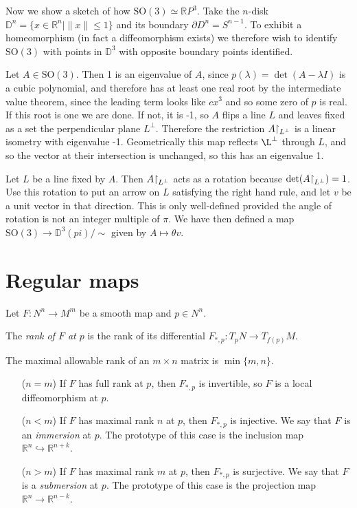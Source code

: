 Now we show a sketch of how $\mathrm{SO}(3) \simeq \mathbb{R}P^3$.
Take the $n$-disk
$\mathbb{D}^n = \{ x \in \mathbb{R}^n \vert \| x \| \leq 1 \}$ and its
boundary $\partial D^n = S^{n-1}$. To exhibit a homeomorphism (in fact
a diffeomorphism exists) we therefore wish to identify
$\mathrm{SO}(3)$ with points in $\mathbb{D}^3$ with opposite boundary
points identified.

Let $A \in \mathrm{SO}(3)$. Then 1 is an eigenvalue of $A$, since
$p(\lambda) = \det(A - \lambda I)$ is a cubic polynomial, and
therefore has at least one real root by the intermediate value
theorem, since the leading term looks like $cx^3$ and so some zero of
$p$ is real. If this root is one we are done. If not, it is -1, so
$A$ flips a line $L$ and leaves fixed as a set the perpendicular plane
$L^\perp$. Therefore the restriction $A\mathord{\upharpoonright}_{L^\perp}$ is a
linear isometry with eigenvalue -1. Geometrically this map reflects
$\L^\perp$ through $L$, and so the vector at their intersection is
unchanged, so this has an eigenvalue 1.

Let $L$ be a line fixed by $A$. Then $A\mathord{\upharpoonright}_{L^\perp}$ acts as a
rotation because $\det(A\mathord{\upharpoonright}_{L^\perp}) = 1$. Use this rotation
to put an arrow on $L$ satisfying the right hand rule, and let $v$ be
a unit vector in that direction. This is only well-defined provided
the angle of rotation is not an integer multiple of $\pi$. We have
then defined a map $\mathrm{SO}(3) \to \mathbb{D}^3(pi) / \sim$ given
by
$A \mapsto \theta v$.

\section{Regular maps}
Let $F: N^n \to M^m$ be a smooth map and $p \in N^n$.
\begin{defn}[Rank]
The \emph{rank of $F$ at $p$} is the rank of its differential
$F_{\ast,p} : T_pN \to T_{f(p)}M$.
\end{defn}

The maximal allowable rank of an
$m \times n$ matrix is $\min\{m, n\}$.
\begin{itemize}
  \item[($n = m$)]{
    If $F$ has full rank at $p$, then $F_{\ast,p}$ is invertible, so
    $F$ is a local diffeomorphism at $p$.
  }
  \item[($n < m$)]{
    If $F$ has maximal rank $n$ at $p$, then $F_{\ast,p}$ is injective. We
    say that $F$ is an \emph{immersion} at $p$. The prototype of this
    case is the inclusion map $\mathbb{R}^n \hookrightarrow \mathbb{R}^{n+k}$.
  }
  \item[($n > m$)]{
    If $F$ has maximal rank $m$ at $p$, then $F_{\ast, p}$ is
    surjective. We say that $F$ is a \emph{submersion} at $p$. The
    prototype of this case is the projection map
    $\mathbb{R}^n \to \mathbb{R}^{n-k}$.
  }
\end{itemize}

